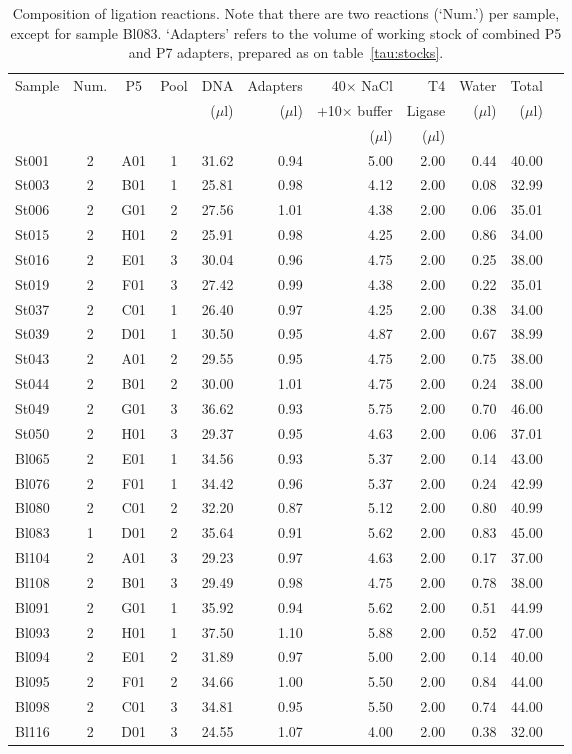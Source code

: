 \documentclass[a4paper,12pt,twosided]{article}
\begin{document}
\begin{table}
\begin{center}
{\footnotesize
\caption{Composition of ligation reactions. Note that there are two reactions (`Num.') per sample, except for sample Bl083. `Adapters' refers to the volume of working stock of combined P5 and P7 adapters, prepared as on table~\ref{tau:stocks}.}\label{tau:ligations3}
\vspace*{0.2cm}
\begin{tabular}{lcccrrrrrrr}
\toprule
Sample&Num.&P5&Pool&DNA&Adapters&40$\times$ NaCl&T4&Water&Total\\
&&&&($\mu$l)&($\mu$l)&+10$\times$ buffer&Ligase&($\mu$l)&($\mu$l)\\
&&&&&&($\mu$l)&($\mu$l)&&\\
\midrule
St001&2&A01&1&31.62&0.94&5.00&2.00&0.44&40.00\\
St003&2&B01&1&25.81&0.98&4.12&2.00&0.08&32.99\\
St006&2&G01&2&27.56&1.01&4.38&2.00&0.06&35.01\\
St015&2&H01&2&25.91&0.98&4.25&2.00&0.86&34.00\\
St016&2&E01&3&30.04&0.96&4.75&2.00&0.25&38.00\\
St019&2&F01&3&27.42&0.99&4.38&2.00&0.22&35.01\\
St037&2&C01&1&26.40&0.97&4.25&2.00&0.38&34.00\\
St039&2&D01&1&30.50&0.95&4.87&2.00&0.67&38.99\\
St043&2&A01&2&29.55&0.95&4.75&2.00&0.75&38.00\\
St044&2&B01&2&30.00&1.01&4.75&2.00&0.24&38.00\\
St049&2&G01&3&36.62&0.93&5.75&2.00&0.70&46.00\\
St050&2&H01&3&29.37&0.95&4.63&2.00&0.06&37.01\\
Bl065&2&E01&1&34.56&0.93&5.37&2.00&0.14&43.00\\
Bl076&2&F01&1&34.42&0.96&5.37&2.00&0.24&42.99\\
Bl080&2&C01&2&32.20&0.87&5.12&2.00&0.80&40.99\\
Bl083&1&D01&2&35.64&0.91&5.62&2.00&0.83&45.00\\
Bl104&2&A01&3&29.23&0.97&4.63&2.00&0.17&37.00\\
Bl108&2&B01&3&29.49&0.98&4.75&2.00&0.78&38.00\\
Bl091&2&G01&1&35.92&0.94&5.62&2.00&0.51&44.99\\
Bl093&2&H01&1&37.50&1.10&5.88&2.00&0.52&47.00\\
Bl094&2&E01&2&31.89&0.97&5.00&2.00&0.14&40.00\\
Bl095&2&F01&2&34.66&1.00&5.50&2.00&0.84&44.00\\
Bl098&2&C01&3&34.81&0.95&5.50&2.00&0.74&44.00\\
Bl116&2&D01&3&24.55&1.07&4.00&2.00&0.38&32.00\\
\bottomrule
\end{tabular}
}
\end{center}
\end{table}
\end{document}
